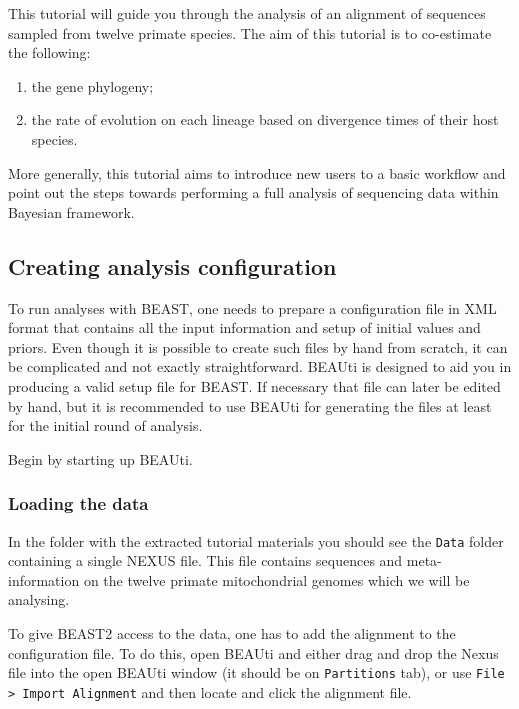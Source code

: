 \documentclass[11pt]{article}
\begin{document}
This tutorial will guide you through the analysis of an alignment of sequences sampled from twelve primate species. The aim of this tutorial is to co-estimate the following:
\begin{enumerate}
	\item the gene phylogeny;
	\item the rate of evolution on each lineage based on divergence times of their host species.
\end{enumerate}

More generally, this tutorial aims to introduce new users to a basic workflow and point out the steps towards performing a full analysis of sequencing data within Bayesian framework.

\subsection{Creating analysis configuration}

To run analyses with BEAST, one needs to prepare a configuration file in XML format that contains all the input information and setup of initial values and priors. Even though it is possible to create such files by hand from scratch, it can be complicated and not exactly straightforward. BEAUti is designed to aid you in producing a valid setup file for BEAST. If necessary that file can later be edited by hand, but it is recommended to use BEAUti for generating the files at least for the initial round of analysis.

\begin{framed}
Begin by starting up BEAUti.
\end{framed}

\clearpage
\subsubsection{Loading the data}

In the folder with the extracted tutorial materials you should see the \texttt{Data} folder containing a single NEXUS file. This file contains sequences and meta-information on the twelve primate mitochondrial genomes which we will be analysing.

To give BEAST2 access to the data, one has to add the alignment to the configuration file. To do this, open BEAUti and either drag and drop the Nexus file into the open BEAUti window (it should be on \texttt{Partitions} tab), or use \texttt{File > Import Alignment} and then locate and click the alignment file.
\end{document}
